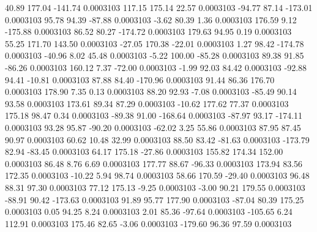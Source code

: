        40.89      177.04     -141.74     0.0003103
      117.15      175.14       22.57     0.0003103
      -94.77       87.14     -173.01     0.0003103
       95.78       94.39      -87.88     0.0003103
       -3.62       80.39        1.36     0.0003103
      176.59        9.12     -175.88     0.0003103
       86.52       80.27     -174.72     0.0003103
      179.63       94.95        0.19     0.0003103
       55.25      171.70      143.50     0.0003103
      -27.05      170.38      -22.01     0.0003103
        1.27       98.42     -174.78     0.0003103
      -40.96        8.02       45.48     0.0003103
       -5.22      100.00      -85.28     0.0003103
       89.38       91.85      -86.26     0.0003103
      160.12        7.37      -72.00     0.0003103
       -1.99       92.03       84.42     0.0003103
      -92.88       94.41      -10.81     0.0003103
       87.88       84.40     -170.96     0.0003103
       91.44       86.36      176.70     0.0003103
      178.90        7.35        0.13     0.0003103
       88.20       92.93       -7.08     0.0003103
      -85.49       90.14       93.58     0.0003103
      173.61       89.34       87.29     0.0003103
      -10.62      177.62       77.37     0.0003103
      175.18       98.47        0.34     0.0003103
      -89.38       91.00     -168.64     0.0003103
      -87.97       93.17     -174.11     0.0003103
       93.28       95.87      -90.20     0.0003103
      -62.02        3.25       55.86     0.0003103
       87.95       87.45       90.97     0.0003103
       60.62       10.48       32.99     0.0003103
       88.50       83.42      -81.63     0.0003103
     -173.79       82.94      -83.45     0.0003103
       64.17      175.18      -27.86     0.0003103
      155.82      174.34      152.00     0.0003103
       86.48        8.76        6.69     0.0003103
      177.77       88.67      -96.33     0.0003103
      173.94       83.56      172.35     0.0003103
      -10.22        5.94       98.74     0.0003103
       58.66      170.59      -29.40     0.0003103
       96.48       88.31       97.30     0.0003103
       77.12      175.13       -9.25     0.0003103
       -3.00       90.21      179.55     0.0003103
      -88.91       90.42     -173.63     0.0003103
       91.89       95.77      177.90     0.0003103
      -87.04       80.39      175.25     0.0003103
        0.05       94.25        8.24     0.0003103
        2.01       85.36      -97.64     0.0003103
     -105.65        6.24      112.91     0.0003103
      175.46       82.65       -3.06     0.0003103
     -179.60       96.36       97.59     0.0003103
